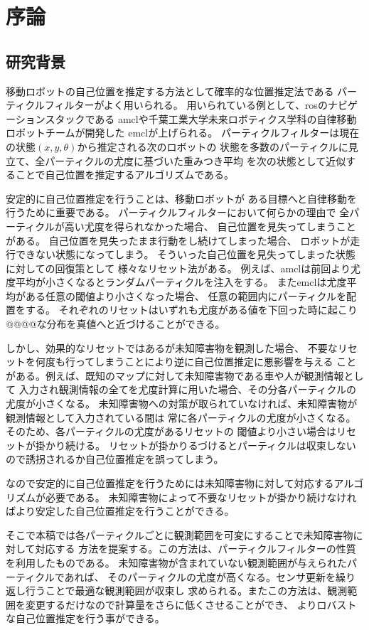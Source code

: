 \chapter{序論}
\section{研究背景}
移動ロボットの自己位置を推定する方法として確率的な位置推定法である
パーティクルフィルターがよく用いられる。
用いられている例として、rosのナビゲーションスタックである
amclや千葉工業大学未来ロボティクス学科の自律移動ロボットチームが開発した
emclが上げられる。
パーティクルフィルターは現在の状態$(x,y,\theta)$から推定される次のロボットの
状態を多数のパーティクルに見立て、全パーティクルの尤度に基づいた重みつき平均
を次の状態として近似することで自己位置を推定するアルゴリズムである。

安定的に自己位置推定を行うことは、移動ロボットが
ある目標へと自律移動を行うために重要である。
パーティクルフィルターにおいて何らかの理由で
全パーティクルが高い尤度を得られなかった場合、
自己位置を見失ってしまうことがある。
自己位置を見失ったまま行動をし続けてしまった場合、
ロボットが走行できない状態になってしまう。
そういった自己位置を見失ってしまった状態に対しての回復策として
様々なリセット法がある。
例えば、amclは前回より尤度平均が小さくなるとランダムパーティクルを注入をする。
またemclは尤度平均がある任意の閾値より小さくなった場合、
任意の範囲内にパーティクルを配置をする。
それぞれのリセットはいずれも尤度がある値を下回った時に起こり
@@@@な分布を真値へと近づけることができる。

しかし、効果的なリセットではあるが未知障害物を観測した場合、
不要なリセットを何度も行ってしまうことにより逆に自己位置推定に悪影響を与える
ことがある。例えば、既知のマップに対して未知障害物である車や人が観測情報として
入力され観測情報の全てを尤度計算に用いた場合、その分各パーティクルの尤度が小さくなる。
未知障害物への対策が取られていなければ、未知障害物が観測情報として入力されている間は
常に各パーティクルの尤度が小さくなる。そのため、各パーティクルの尤度があるリセットの
閾値より小さい場合はリセットが掛かり続ける。
リセットが掛かりるづけるとパーティクルは収束しないので誘拐されるか自己位置推定を誤ってしまう。

なので安定的に自己位置推定を行うためには未知障害物に対して対応するアルゴリズムが必要である。
未知障害物によって不要なリセットが掛かり続けなければより安定した自己位置推定を行うことができる。

そこで本稿では各パーティクルごとに観測範囲を可変にすることで未知障害物に対して対応する
方法を提案する。この方法は、パーティクルフィルターの性質を利用したものである。
未知障害物が含まれていない観測範囲が与えられたパーティクルであれば、
そのパーティクルの尤度が高くなる。センサ更新を繰り返し行うことで最適な観測範囲が収束し
求められる。またこの方法は、観測範囲を変更するだけなので計算量をさらに低くさせることができ、
よりロバストな自己位置推定を行う事ができる。

